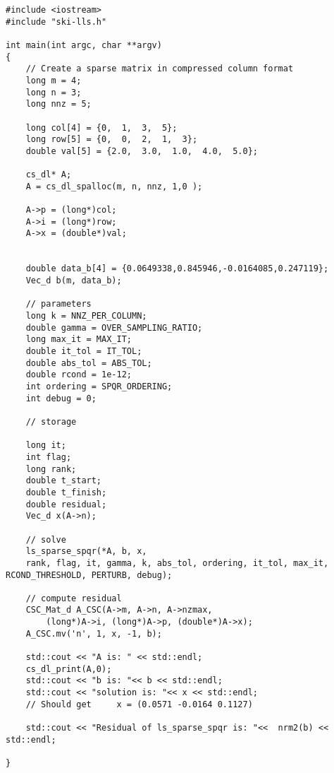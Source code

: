 \documentclass[english,11pt]{article}
\begin{document}
\begin{lstlisting}[breaklines=true, showstringspaces=false]
#include <iostream>
#include "ski-lls.h"

int main(int argc, char **argv)
{
	// Create a sparse matrix in compressed column format
    long m = 4;
    long n = 3;
    long nnz = 5;

    long col[4] = {0,  1,  3,  5};
    long row[5] = {0,  0,  2,  1,  3}; 
    double val[5] = {2.0,  3.0,  1.0,  4.0,  5.0};

    cs_dl* A;
    A = cs_dl_spalloc(m, n, nnz, 1,0 );

    A->p = (long*)col;
    A->i = (long*)row;
    A->x = (double*)val;


    double data_b[4] = {0.0649338,0.845946,-0.0164085,0.247119};
    Vec_d b(m, data_b);

    // parameters
    long k = NNZ_PER_COLUMN;
    double gamma = OVER_SAMPLING_RATIO;
    long max_it = MAX_IT;
    double it_tol = IT_TOL;
    double abs_tol = ABS_TOL;
    double rcond = 1e-12;
    int ordering = SPQR_ORDERING;
    int debug = 0;

    // storage

    long it;
    int flag;
    long rank;
    double t_start;
    double t_finish;
    double residual;   
    Vec_d x(A->n);

    // solve
    ls_sparse_spqr(*A, b, x, 
    rank, flag, it, gamma, k, abs_tol, ordering, it_tol, max_it, RCOND_THRESHOLD, PERTURB, debug);

    // compute residual
    CSC_Mat_d A_CSC(A->m, A->n, A->nzmax, 
        (long*)A->i, (long*)A->p, (double*)A->x);
    A_CSC.mv('n', 1, x, -1, b);

    std::cout << "A is: " << std::endl;
    cs_dl_print(A,0);
    std::cout << "b is: "<< b << std::endl;
    std::cout << "solution is: "<< x << std::endl;
    // Should get     x = (0.0571 -0.0164 0.1127)

    std::cout << "Residual of ls_sparse_spqr is: "<<  nrm2(b) << std::endl;

}
\end{lstlisting}

 


\appendix
\end{document}
